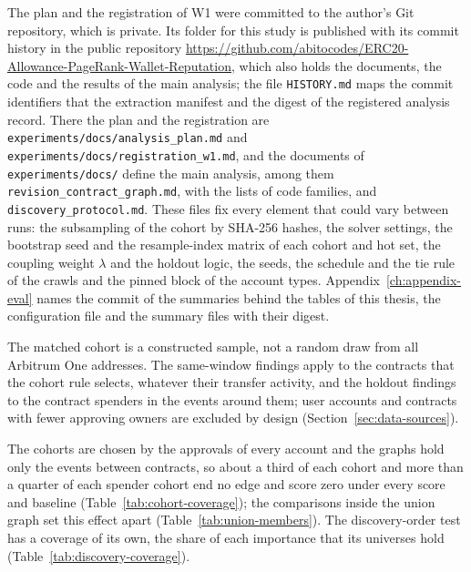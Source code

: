 The plan and the registration of W1 were committed to the author's Git repository, which is private. Its folder for this study is published with its commit history in the public repository \url{https://github.com/abitocodes/ERC20-Allowance-PageRank-Wallet-Reputation}, which also holds the documents, the code and the results of the main analysis; the file \texttt{HISTORY.md} maps the commit identifiers that the extraction manifest and the digest of the registered analysis record. There the plan and the registration are \texttt{experiments/docs/analysis\_plan.md} and \texttt{experiments/docs/registration\_w1.md}, and the documents of \texttt{experiments/docs/} define the main analysis, among them \texttt{revision\_contract\_graph.md}, with the lists of code families, and \texttt{discovery\_protocol.md}. These files fix every element that could vary between runs: the subsampling of the cohort by SHA-256 hashes, the solver settings, the bootstrap seed and the resample-index matrix of each cohort and hot set, the coupling weight $\lambda$ and the holdout logic, the seeds, the schedule and the tie rule of the crawls and the pinned block of the account types. Appendix~\ref{ch:appendix-eval} names the commit of the summaries behind the tables of this thesis, the configuration file and the summary files with their digest.


The matched cohort is a constructed sample, not a random draw from all Arbitrum One addresses. The same-window findings apply to the contracts that the cohort rule selects, whatever their transfer activity, and the holdout findings to the contract spenders in the events around them; user accounts and contracts with fewer approving owners are excluded by design (Section~\ref{sec:data-sources}).

The cohorts are chosen by the approvals of every account and the graphs hold only the events between contracts, so about a third of each cohort and more than a quarter of each spender cohort end no edge and score zero under every score and baseline (Table~\ref{tab:cohort-coverage}); the comparisons inside the union graph set this effect apart (Table~\ref{tab:union-members}). The discovery-order test has a coverage of its own, the share of each importance that its universes hold (Table~\ref{tab:discovery-coverage}).

